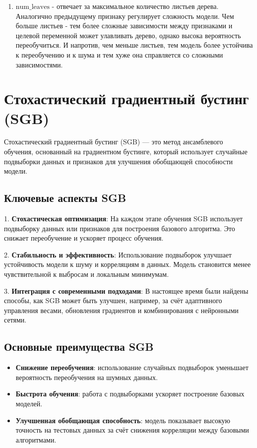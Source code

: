 \begin{enumerate}
\begin{enumerate}
              \item $\text{num\_leaves}$ - отвечает за максимальное количество листьев дерева. Аналогично предыдущему признаку регулирует сложность модели. Чем больше листьев - тем более сложные зависимости между признаками и целевой переменной может улавливать дерево, однако высока вероятность переобучиться. И напротив, чем меньше листьев, тем модель более устойчива к переобучению и к шума и тем хуже она справляется со сложными зависимостями.
          \end{enumerate}
\end{enumerate}



\section{Стохастический градиентный бустинг (SGB)}

Стохастический градиентный бустинг (SGB) — это метод ансамблевого обучения, основанный на градиентном бустинге, который использует случайные подвыборки данных и признаков для улучшения обобщающей способности модели.

\subsection{Ключевые аспекты SGB}

1. \textbf{Стохастическая оптимизация}:
На каждом этапе обучения SGB использует подвыборку данных или признаков для построения базового алгоритма. Это снижает переобучение и ускоряет процесс обучения.

2. \textbf{Стабильность и эффективность}:
Использование подвыборок улучшает устойчивость модели к шуму и корреляциям в данных. Модель становится менее чувствительной к выбросам и локальным минимумам.

3. \textbf{Интеграция с современными подходами}:
В настоящее время были найдены способы, как SGB может быть улучшен, например, за счёт адаптивного управления весами, обновления градиентов и комбинирования с нейронными сетями.

\subsection{Основные преимущества SGB}

\begin{itemize}
    \item \textbf{Снижение переобучения}: использование случайных подвыборок уменьшает вероятность переобучения на шумных данных.
    \item \textbf{Быстрота обучения}: работа с подвыборками ускоряет построение базовых моделей.
    \item \textbf{Улучшенная обобщающая способность}: модель показывает высокую точность на тестовых данных за счёт снижения корреляции между базовыми алгоритмами.
\end{itemize}

